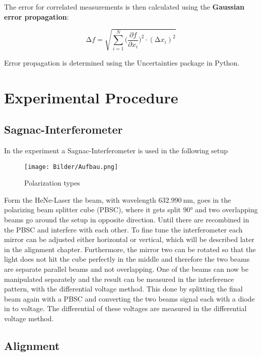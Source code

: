 The error for correlated measurements is then calculated using the \textbf{Gaussian error propagation}:

\begin{equation}
    \increment{f} = \sqrt{ \sum_{i = 1}^{N}  \biggl(\frac{\partial{f}}{\partial{x_i}}\biggr)^2\cdot(\increment{x_i})^2}
    \label{eqn:Gauss}
\end{equation}

Error propagation is determined using the Uncertainties \cite{uncertainties} package in Python.


\section{Experimental Procedure}
\subsection{Sagnac-Interferometer}
In the experiment a Sagnac-Interferometer is used in the following setup

\begin{figure}[H]
	\centering
	\texttt{[image: Bilder/Aufbau.png]}
	\caption{Polarization types \cite{man:64}}\label{fig:Aufbau}
\end{figure}

Form the HeNe-Laser the beam, with wavelength $\qty{632.990}{\nano\meter}$, goes in the polarizing beam splitter cube (PBSC), 
where it gets split $90°$ and two overlapping beams go around the setup in opposite direction. 
Until there are recombined in the PBSC and interfere with each other. 
To fine tune the interferometer each mirror can be adjusted either horizontal or vertical, which will be described later in the alignment chapter.
Furthermore, the mirror two can be rotated so that the light does not hit the cube perfectly in the middle 
and therefore the two beams are separate parallel beams and not overlapping. 
One of the beams can now be manipulated separately and the result can be measured in the interference pattern, with the differential voltage method. 
This done by splitting the final beam again with a PBSC and converting the two beams signal each with a diode in to voltage. 
The differential of these voltages are measured in the differential voltage method.

\subsection{Alignment}

